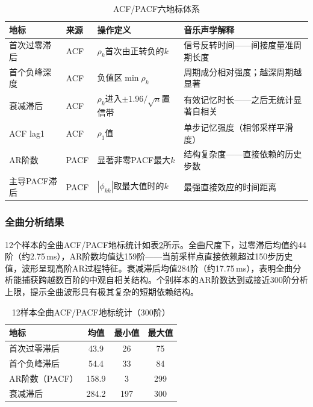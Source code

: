 \documentclass[12pt,a4paper]{article}
\begin{document}
\begin{table}[htbp]
    \centering
    \caption{ACF/PACF六地标体系}
    \label{tab:landmarks}
    \small
    \begin{tabularx}{\textwidth}{p{2.2cm}p{2cm}p{3.8cm}X}
        \toprule
        \textbf{地标} & \textbf{来源} & \textbf{操作定义} & \textbf{音乐声学解释} \\
        \midrule
        首次过零滞后 & ACF & $\rho_k$首次由正转负的$k$ & 信号反转时间——间接度量准周期长度 \\
        首个负峰深度 & ACF & 负值区$\min\rho_k$ & 周期成分相对强度；越深周期越显著 \\
        衰减滞后 & ACF & $\rho_k$进入$\pm1.96/\sqrt{n}$置信带 & 有效记忆时长——之后无统计显著自相关 \\
        ACF lag1 & ACF & $\rho_1$值 & 单步记忆强度（相邻采样平滑度） \\
        AR阶数 & PACF & 显著非零PACF最大$k$ & 结构复杂度——直接依赖的历史步数 \\
        主导PACF滞后 & PACF & $|\phi_{kk}|$取最大值时的$k$ & 最强直接效应的时间距离 \\
        \bottomrule
    \end{tabularx}
\end{table}

\FloatBarrier
\subsubsection{全曲分析结果}

12个样本的全曲ACF/PACF地标统计如表\ref{tab:acf_stats}所示。全曲尺度下，过零滞后均值约44阶（约2.75\,ms），AR阶数均值达159阶——当前采样点直接依赖超过150步历史值，波形呈现高阶AR过程特征。衰减滞后均值284阶（约17.75\,ms），表明全曲分析能捕获跨越数百阶的中观自相关结构。个别样本的AR阶数达到或接近300阶分析上限，提示全曲波形具有极其复杂的短期依赖结构。

\begin{table}[htbp]
    \centering
    \caption{12样本全曲ACF/PACF地标统计（300阶）}
    \label{tab:acf_stats}
    \begin{tabular}{lccc}
        \toprule
        \textbf{地标} & \textbf{均值} & \textbf{最小值} & \textbf{最大值} \\
        \midrule
        首次过零滞后 & 43.9 & 26 & 75 \\
        首个负峰滞后 & 54.4 & 33 & 84 \\
        AR阶数（PACF） & 158.9 & 3 & 299 \\
        衰减滞后 & 284.2 & 197 & 300 \\
        \bottomrule
    \end{tabular}
\end{table}
\end{document}
